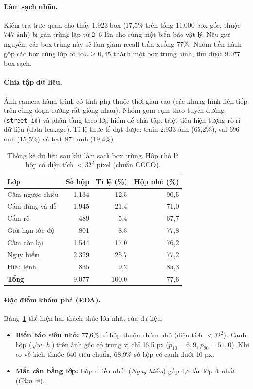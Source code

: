\documentclass[11pt]{article}
\begin{document}
\paragraph{Làm sạch nhãn.}
Kiểm tra trực quan cho thấy 1.923 box (17,5\% trên tổng 11.000 box gốc, thuộc 747 ảnh) bị gán trùng lặp từ 2--6 lần cho cùng một biển báo vật lý. Nếu giữ nguyên, các box trùng này sẽ làm giảm recall trần xuống 77\%. Nhóm tiến hành gộp các box cùng lớp có $\text{IoU} \ge 0{,}45$ thành một box trung bình, thu được 9.077 box sạch.

\paragraph{Chia tập dữ liệu.}
Ảnh camera hành trình có tính phụ thuộc thời gian cao (các khung hình liên tiếp trên cùng đoạn đường rất giống nhau). Nhóm gom cụm theo tuyến đường (\texttt{street\_id}) và phân tầng theo lớp hiếm để chia tập, triệt tiêu hiện tượng rò rỉ dữ liệu (data leakage). Tỉ lệ thực tế đạt được: train 2.933 ảnh (65,2\%), val 696 ảnh (15,5\%) và test 871 ảnh (19,4\%).

\begin{table}[t]
\centering
\small
\begin{tabular}{lrrr}
\toprule
\textbf{Lớp} & \textbf{Số hộp} & \textbf{Tỉ lệ (\%)} & \textbf{Hộp nhỏ (\%)} \\
\midrule
Cấm ngược chiều  & 1.134 & 12,5 & 90,5 \\
Cấm dừng và đỗ   & 1.945 & 21,4 & 71,0 \\
Cấm rẽ           &   489 &  5,4 & 67,7 \\
Giới hạn tốc độ  &   801 &  8,8 & 77,8 \\
Cấm còn lại      & 1.544 & 17,0 & 76,2 \\
Nguy hiểm        & 2.329 & 25,7 & 77,2 \\
Hiệu lệnh        &   835 &  9,2 & 85,3 \\
\midrule
\textbf{Tổng}    & 9.077 & 100,0 & 77,6 \\
\bottomrule
\end{tabular}
\caption{Thống kê dữ liệu sau khi làm sạch box trùng. Hộp nhỏ là hộp có diện tích $< 32^2$ pixel (chuẩn COCO).}
\label{tab:eda}
\end{table}

\paragraph{Đặc điểm khám phá (EDA).}
Bảng~\ref{tab:eda} thể hiện hai thách thức lớn nhất của dữ liệu:
\begin{itemize}
\itemsep0pt
\item \textbf{Biển báo siêu nhỏ:} 77,6\% số hộp thuộc nhóm nhỏ (diện tích $< 32^2$). Cạnh hộp ($\sqrt{w \cdot h}$) trên ảnh gốc có trung vị chỉ 16,5 px ($p_{10}=6{,}9$, $p_{90}=51{,}0$). Khi co về kích thước 640 tiêu chuẩn, 68,9\% số hộp có cạnh dưới 10 px.
\item \textbf{Mất cân bằng lớp:} Lớp nhiều nhất (\textit{Nguy hiểm}) gấp 4,8 lần lớp ít nhất (\textit{Cấm rẽ}).
\end{itemize}
\end{document}
